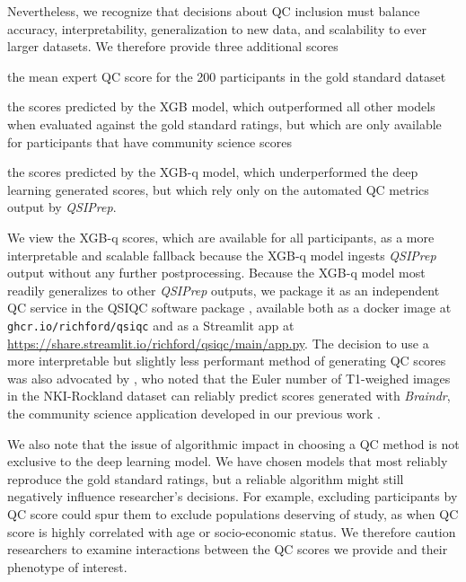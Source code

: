 \documentclass[9pt,lineno]{elife}
\begin{document}
Nevertheless, we recognize that decisions about QC inclusion must balance accuracy, interpretability, generalization to new data, and scalability to ever larger datasets. We therefore provide three additional scores
\begin{enumerate*}[%
    label=(\roman*),%
    before=\unskip{: },%
    itemjoin={{, }},%
    itemjoin*={{, and }}]
    \item the mean expert QC score for the 200 participants in the gold standard
    dataset
    \item the scores predicted by the XGB model, which outperformed all other models
    when evaluated against the gold standard ratings, but which are only available
    for participants that have community science scores
    \item the scores predicted by the XGB-q model, which underperformed the deep
    learning generated scores, but which rely only on the automated QC metrics
    output by \emph{QSIPrep}.
\end{enumerate*}
We view the XGB-q scores, which are available for all participants, as a more interpretable and scalable fallback because the XGB-q model ingests \emph{QSIPrep} output without any further postprocessing.
Because the XGB-q model most readily generalizes to other \emph{QSIPrep} outputs, we package it as an independent QC service in the QSIQC software package \cite{richiehalford2022qsiqc}, available both as a docker image at \texttt{ghcr.io/richford/qsiqc} and as a Streamlit app at \url{https://share.streamlit.io/richford/qsiqc/main/app.py}.
The decision to use a more interpretable but slightly less
performant method of generating QC scores was also advocated by
\cite{tobe2021longitudinal}, who noted that the Euler number of T1-weighed
images \cite{rosen2018quantitative} in the NKI-Rockland dataset can reliably predict scores generated with
\emph{Braindr}, the community science application developed in our previous work
\citep{keshavan2019-er}.

We also note that the issue of algorithmic impact in choosing a QC method is not
exclusive to the deep learning model. We have chosen models that most reliably
reproduce the gold standard ratings, but a reliable algorithm might still
negatively influence researcher's decisions. For example, excluding participants
by QC score could spur them to exclude populations deserving of study, as when
QC score is highly correlated with age or socio-economic status. We therefore
caution researchers to examine interactions between the QC scores we provide and
their phenotype of interest.
\end{document}
